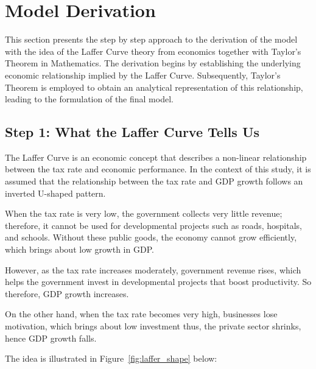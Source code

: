 \documentclass[12pt,a4paper]{report}
\theoremstyle{definition}
\theoremstyle{plain}
\theoremstyle{remark}
\begin{document}
	
	\section{Model Derivation}
	
	This section presents the step by step approach to the derivation of the model with the idea of the Laffer Curve theory from economics together with Taylor's Theorem in Mathematics. The derivation begins by establishing the underlying economic relationship implied by the Laffer Curve. Subsequently, Taylor's Theorem is employed to obtain an analytical representation of this relationship, leading to the formulation of the final model.
	
	\subsection*{Step 1: What the Laffer Curve Tells Us}
	
	The Laffer Curve is an economic concept that describes a non-linear relationship between the tax rate and economic performance. In the context of this study, it is assumed that the relationship between the tax rate and GDP growth follows an inverted U-shaped pattern.
	
	When the tax rate is very low, the government collects very little revenue; therefore, it cannot be used for developmental projects such as roads, hospitals, and schools. Without these public goods, the economy cannot grow efficiently, which brings about low growth in GDP.
	
	However, as the tax rate increases moderately, government revenue rises, which helps the government invest in developmental projects that boost productivity. So therefore, GDP growth increases.
	
	On the other hand, when the tax rate becomes very high, businesses lose motivation, which brings about low investment thus, the private sector shrinks, hence GDP growth falls.
	
	The idea is illustrated in Figure~\ref{fig:laffer_shape} below:
	
\end{document}
